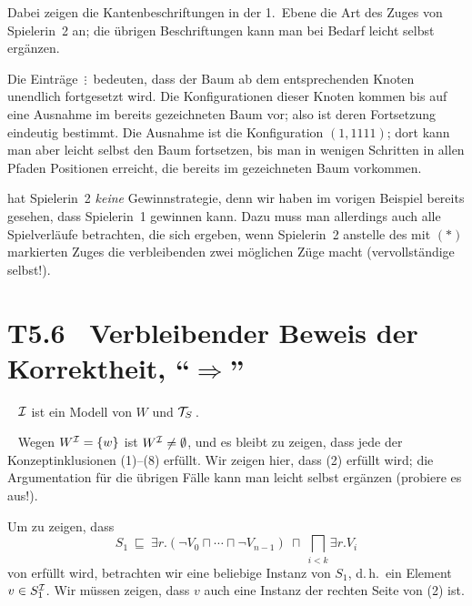 \documentclass[fontsize=11pt, twoside=false, numbers=autoenddot]{scrbook}
\begin{document}
\begin{center}
\begin{tikzpicture}
  \end{tikzpicture}%
\end{center}
%
Dabei zeigen die Kantenbeschriftungen in der 1.\ Ebene die Art des Zuges von Spielerin~2 an; die übrigen Beschriftungen kann man bei Bedarf leicht selbst ergänzen.

\par\vspace*{-.2\baselineskip}
Die Einträge \,$\vdots$\, bedeuten, dass der Baum ab dem entsprechenden Knoten
unendlich fortgesetzt wird.
Die Konfigurationen dieser Knoten kommen bis auf eine Ausnahme im bereits gezeichneten Baum vor; also ist deren Fortsetzung eindeutig bestimmt.
Die Ausnahme ist die Konfiguration $(1,1111)$;
dort kann man aber leicht selbst den Baum fortsetzen,
bis man in wenigen Schritten in allen Pfaden Positionen erreicht,
die bereits im gezeichneten Baum vorkommen.

\parII
{} hat Spielerin~2 \emph{keine} Gewinnstrategie,
denn wir haben im vorigen Beispiel bereits gesehen,
dass Spielerin~1 gewinnen kann.
Dazu muss man allerdings auch alle Spielverläufe betrachten,
die sich ergeben, wenn Spielerin~2 anstelle des mit $(*)$ markierten Zuges
die verbleibenden zwei möglichen Züge macht (vervollständige selbst!).

\pagebreak
\section*{T5.6~ Verbleibender Beweis der Korrektheit, {\boldmath "`$\Rightarrow$"'}}

~ $\Imc$ ist ein Modell von $W$ und $\Tmc_S$\,.

\parII
{}~
Wegen $W^\Imc = \{w\}$ ist $W^\Imc \neq \emptyset$, und es bleibt zu zeigen,
dass \Imc jede der Konzeptinklusionen (1)--(8) erfüllt.
Wir zeigen hier, dass (2) erfüllt wird; die Argumentation für die übrigen Fälle
kann man leicht selbst ergänzen (probiere es aus!).

Um zu zeigen, dass
\[
  S_1 ~\sqsubseteq~ \exists r . (\neg V_0 \sqcap \cdots \sqcap \neg V_{n-1}) ~\sqcap~ \bigsqcap_{i < k} \exists r . V_i
  \tag{2}
\]
von \Imc erfüllt wird, betrachten wir eine beliebige Instanz von $S_1$,
d.\,h.\ ein Element $v \in S_1^\Imc$. Wir müssen zeigen, dass $v$ auch
eine Instanz der rechten Seite von (2) ist.
\end{document}
